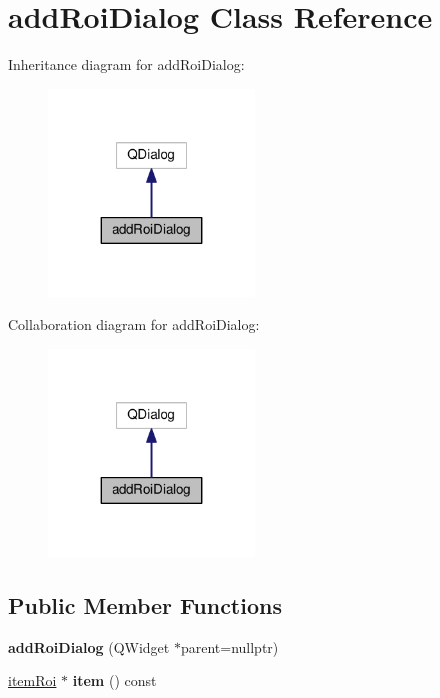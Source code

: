 \hypertarget{classaddRoiDialog}{}\section{add\+Roi\+Dialog Class Reference}
\label{classaddRoiDialog}


Inheritance diagram for add\+Roi\+Dialog\+:\nopagebreak
\begin{figure}[H]
\begin{center}
\leavevmode
\includegraphics[width=155pt]{classaddRoiDialog__inherit__graph}
\end{center}
\end{figure}


Collaboration diagram for add\+Roi\+Dialog\+:\nopagebreak
\begin{figure}[H]
\begin{center}
\leavevmode
\includegraphics[width=155pt]{classaddRoiDialog__coll__graph}
\end{center}
\end{figure}
\subsection*{Public Member Functions}
\begin{DoxyCompactItemize}
\item 
{\bfseries add\+Roi\+Dialog} (Q\+Widget $\ast$parent=nullptr)\hypertarget{classaddRoiDialog_a8b7fc43685d1f03fdc1b46aa89747649}{}\label{classaddRoiDialog_a8b7fc43685d1f03fdc1b46aa89747649}

\item 
\hyperlink{classitemRoi}{item\+Roi} $\ast$ {\bfseries item} () const \hypertarget{classaddRoiDialog_a7317773bb81dbb977cc218bcde3ea818}{}\label{classaddRoiDialog_a7317773bb81dbb977cc218bcde3ea818}

\end{DoxyCompactItemize}


